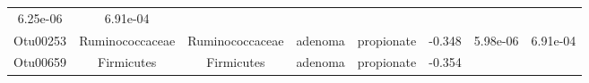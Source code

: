 \documentclass[11pt,]{article}
\begin{document}
\begin{longtable}[]{@{}cccccccc@{}}
\begin{minipage}[t]{0.08\columnwidth}
6.25e-06\strut
\end{minipage} & \begin{minipage}[t]{0.08\columnwidth}\centering\strut
6.91e-04\strut
\end{minipage}\tabularnewline
\begin{minipage}[t]{0.08\columnwidth}\centering\strut
Otu00253\strut
\end{minipage} & \begin{minipage}[t]{0.15\columnwidth}\centering\strut
Ruminococcaceae\strut
\end{minipage} & \begin{minipage}[t]{0.15\columnwidth}\centering\strut
Ruminococcaceae\strut
\end{minipage} & \begin{minipage}[t]{0.08\columnwidth}\centering\strut
adenoma\strut
\end{minipage} & \begin{minipage}[t]{0.09\columnwidth}\centering\strut
propionate\strut
\end{minipage} & \begin{minipage}[t]{0.07\columnwidth}\centering\strut
-0.348\strut
\end{minipage} & \begin{minipage}[t]{0.08\columnwidth}\centering\strut
5.98e-06\strut
\end{minipage} & \begin{minipage}[t]{0.08\columnwidth}\centering\strut
6.91e-04\strut
\end{minipage}\tabularnewline
\begin{minipage}[t]{0.08\columnwidth}\centering\strut
Otu00659\strut
\end{minipage} & \begin{minipage}[t]{0.15\columnwidth}\centering\strut
Firmicutes\strut
\end{minipage} & \begin{minipage}[t]{0.15\columnwidth}\centering\strut
Firmicutes\strut
\end{minipage} & \begin{minipage}[t]{0.08\columnwidth}\centering\strut
adenoma\strut
\end{minipage} & \begin{minipage}[t]{0.09\columnwidth}\centering\strut
propionate\strut
\end{minipage} & \begin{minipage}[t]{0.07\columnwidth}\centering\strut
-0.354\strut
\end{minipage} & \begin{minipage}[t]{0.08\columnwidth}\centering\strut

\end{minipage}
\end{longtable}
\end{document}
